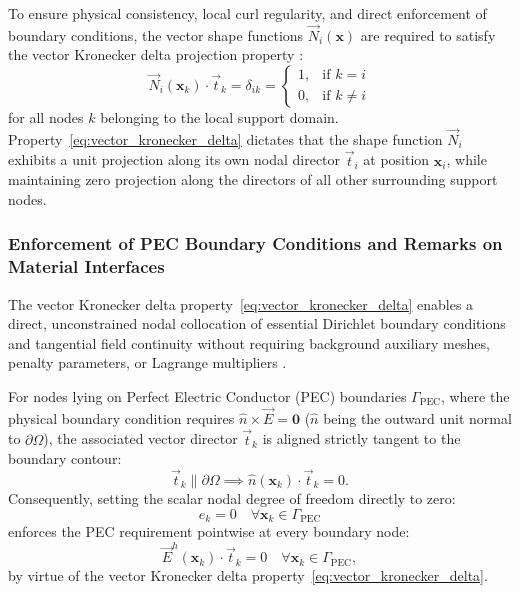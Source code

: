 \documentclass[preprint,12pt]{elsarticle}
\begin{document}
To ensure physical consistency, local curl regularity, and direct enforcement of boundary conditions, the vector shape functions $\vec{N}_i(\mathbf{x})$ are required to satisfy the vector Kronecker delta projection property \cite{lima2017edge, ortiz2021nodal}:
\begin{equation}
    \vec{N}_i(\mathbf{x}_k) \cdot \vec{t}_k = \delta_{ik} = \begin{cases} 1, & \text{if } k = i \\ 0, & \text{if } k \neq i \end{cases}
    \label{eq:vector_kronecker_delta}
\end{equation}
for all nodes $k$ belonging to the local support domain. Property~\eqref{eq:vector_kronecker_delta} dictates that the shape function $\vec{N}_i$ exhibits a unit projection along its own nodal director $\vec{t}_i$ at position $\mathbf{x}_i$, while maintaining zero projection along the directors of all other surrounding support nodes.

\subsubsection{Enforcement of PEC Boundary Conditions and Remarks on Material Interfaces}
The vector Kronecker delta property~\eqref{eq:vector_kronecker_delta} enables a direct, unconstrained nodal collocation of essential Dirichlet boundary conditions and tangential field continuity without requiring background auxiliary meshes, penalty parameters, or Lagrange multipliers \cite{goncalves2023vector, ortiz2021nodal}.

For nodes lying on Perfect Electric Conductor (PEC) boundaries $\Gamma_{\text{PEC}}$, where the physical boundary condition requires $\hat{n} \times \vec{E} = \mathbf{0}$ ($\hat{n}$ being the outward unit normal to $\partial\Omega$), the associated vector director $\vec{t}_k$ is aligned strictly tangent to the boundary contour:
\begin{equation}
    \vec{t}_k \parallel \partial\Omega \implies \hat{n}(\mathbf{x}_k) \cdot \vec{t}_k = 0.
\end{equation}
Consequently, setting the scalar nodal degree of freedom directly to zero:
\begin{equation}
    e_k = 0 \quad \forall \mathbf{x}_k \in \Gamma_{\text{PEC}}
    \label{eq:pec_dirichlet_homog}
\end{equation}
enforces the PEC requirement pointwise at every boundary node:
\begin{equation}
    \vec{E}^h(\mathbf{x}_k) \cdot \vec{t}_k = 0 \quad \forall \mathbf{x}_k \in \Gamma_{\text{PEC}},
    \label{eq:pec_nodal_collocation}
\end{equation}
by virtue of the vector Kronecker delta property~\eqref{eq:vector_kronecker_delta}.
\end{document}
